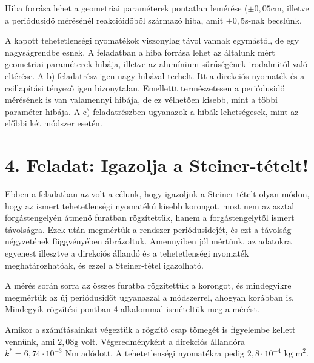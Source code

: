 \documentclass{article}
\begin{document}

Hiba forrása lehet a geometriai paraméterek pontatlan lemérése ($\pm 0,05 \text{cm}$, illetve a periódusidő mérésénél reakcióidőből származó hiba, amit $\pm 0,5 \text{s}$-nak becslünk.

A kapott tehetetlenségi nyomatékok viszonylag távol vannak egymástól, de egy nagyságrendbe esnek. A feladatban a hiba forrása lehet az általunk mért geometriai paraméterek hibája, illetve az alumínium sűrűségének irodalmitól való eltérése. A b) feladatrész igen nagy hibával terhelt. Itt a direkciós nyomaték és a csillapítási tényező igen bizonytalan. Emellettt természetesen a periódusidő mérésének is van valamennyi hibája, de ez vélhetően kisebb, mint a többi paraméter hibája. A c) feladatrészben ugyanazok a hibák lehetségesek, mint az előbbi két módszer esetén.

\newpage

\section*{4. Feladat: Igazolja a Steiner-tételt!}

Ebben a feladatban az volt a célunk, hogy igazoljuk a Steiner-tételt olyan módon, hogy az ismert tehetetlenségi nyomatékú kisebb korongot, most nem az asztal forgástengelyén átmenő furatban rögzítettük, hanem a forgástengelytől ismert távolságra. Ezek után megmértük a rendszer periódusidejét, és ezt a távolság négyzetének függvényében ábrázoltuk. Amennyiben jól mértünk, az adatokra egyenest illesztve a direkciós állandó és a tehetetlenségi nyomaték meghatározhatóak, és ezzel a Steiner-tétel igazolható.

A mérés során sorra az összes furatba rögzítettük a korongot, és mindegyikre megmértük az új periódusidőt ugyanazzal a módszerrel, ahogyan korábban is. Mindegyik rögzítési pontban 4 alkalommal ismételtük meg a mérést.

Amikor a számításainkat végeztük a rögzítő csap tömegét is fígyelembe kellett vennünk, ami $2,08 \text{g}$ volt. Végeredményként a direkciós állandóra $k^{*} = 6,74 \cdot 10^{-3} \text{ Nm}$ adódott. A tehetetlenségi nyomatékra pedig $2,8 \cdot 10^{-4} \text{ kg m}^2$.
\end{document}
